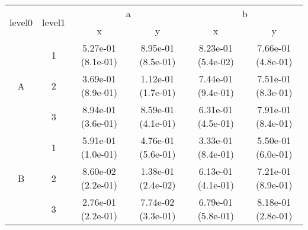 \begin{tabular}{cccccc}
\toprule
\multirow{2}{*}{level0} & \multirow{2}{*}{level1}&\multicolumn{2}{c}{a}&\multicolumn{2}{c}{b}\tabularnewline
\cmidrule(lr){3-4}
\cmidrule(lr){5-6}
&&x&y&x&y\tabularnewline
\midrule
\multirow{3}{*}{A}&1& 5.27e-01 (8.1e-01)& 8.95e-01 (8.5e-01)& 8.23e-01 (5.4e-02)& 7.66e-01 (4.8e-01)\tabularnewline
&2& 3.69e-01 (8.9e-01)& 1.12e-01 (1.7e-01)& 7.44e-01 (9.4e-01)& 7.51e-01 (8.3e-01)\tabularnewline
&3& 8.94e-01 (3.6e-01)& 8.59e-01 (4.1e-01)& 6.31e-01 (4.5e-01)& 7.91e-01 (8.4e-01)\tabularnewline
\midrule
\multirow{3}{*}{B}&1& 5.91e-01 (1.0e-01)& 4.76e-01 (5.6e-01)& 3.33e-01 (8.4e-01)& 5.50e-01 (6.0e-01)\tabularnewline
&2& 8.60e-02 (2.2e-01)& 1.38e-01 (2.4e-02)& 6.13e-01 (4.1e-01)& 7.21e-01 (8.9e-01)\tabularnewline
&3& 2.76e-01 (2.2e-01)& 7.74e-02 (3.3e-01)& 6.79e-01 (5.8e-01)& 8.18e-01 (2.8e-01)\tabularnewline
\bottomrule
\end{tabular}
